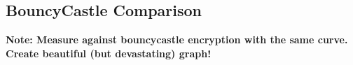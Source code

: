 \subsection{BouncyCastle Comparison}
\label{sec:performance_bouncycastle}
\textbf{Note: Measure against bouncycastle encryption with the same curve. Create beautiful (but devastating) graph!}